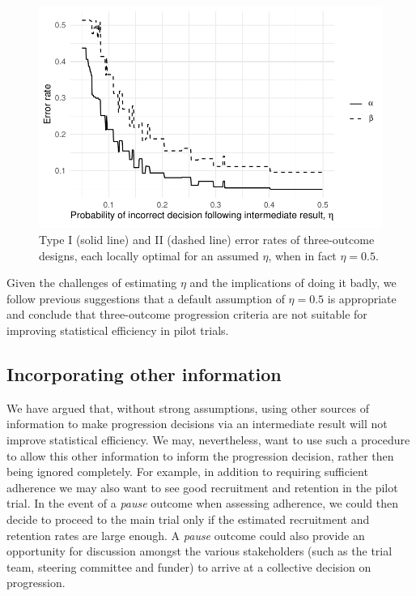 \documentclass{bmcart}
\begin{document}
\begin{figure}
\centering
\includegraphics[scale=0.8]{./figures/eta_true_ocs}
\caption{Type I (solid line) and II (dashed line) error rates of three-outcome designs, each locally optimal for an assumed $\eta$, when in fact $\eta = 0.5$.}
\label{fig:eta_true_ocs}
\end{figure}

Given the challenges of estimating $\eta$ and the implications of doing it badly, we follow previous suggestions \cite{Sargent2001a, Dehbi2020} that a default assumption of $\eta = 0.5$ is appropriate and conclude that three-outcome progression criteria are not suitable for improving statistical efficiency in pilot trials.

\subsection{Incorporating other information}\label{sec:information}

We have argued that, without strong assumptions, using other sources of information to make progression decisions via an intermediate result will not improve statistical efficiency. We may, nevertheless, want to use such a procedure to allow this other information to inform the progression decision, rather then being ignored completely. For example, in addition to requiring sufficient adherence we may also want to see good recruitment and retention in the pilot trial. In the event of a \emph{pause} outcome when assessing adherence, we could then decide to proceed to the main trial only if the estimated recruitment and retention rates are large enough. A \emph{pause} outcome could also provide an opportunity for discussion amongst the various stakeholders (such as the trial team, steering committee and funder) to arrive at a collective decision on progression.
\end{document}
